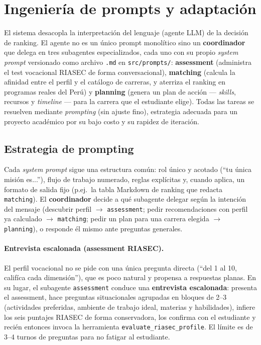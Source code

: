 \section{Ingenier\'ia de prompts y adaptaci\'on}
\label{sec:prompts}

El sistema desacopla la interpretaci\'on del lenguaje (agente LLM) de la
decisi\'on de ranking. El agente no es un \'unico prompt monol\'itico sino un
\textbf{coordinador} que delega en tres subagentes especializados, cada uno con
su propio \emph{system prompt} versionado como archivo \texttt{.md} en
\texttt{src/prompts/}: \textbf{assessment} (administra el test vocacional
RIASEC de forma conversacional), \textbf{matching} (calcula la afinidad entre
el perfil y el cat\'alogo de carreras, y aterriza el ranking en programas
reales del Per\'u) y \textbf{planning} (genera un plan de
acci\'on --- \emph{skills}, recursos y \emph{timeline} --- para la carrera que
el estudiante elige). Todas las tareas se resuelven mediante \emph{prompting}
(sin ajuste fino), estrategia adecuada para un proyecto acad\'emico por su bajo
costo y su rapidez de iteraci\'on.

\subsection{Estrategia de prompting}

Cada \emph{system prompt} sigue una estructura com\'un: rol \'unico y acotado
(``tu \'unica misi\'on es...''), flujo de trabajo numerado, reglas expl\'icitas
y, cuando aplica, un formato de salida fijo (p.ej.\ la tabla Markdown de
ranking que redacta \texttt{matching}). El \textbf{coordinador} decide a qu\'e
subagente delegar seg\'un la intenci\'on del mensaje (descubrir perfil
$\rightarrow$ \texttt{assessment}; pedir recomendaciones con perfil ya
calculado $\rightarrow$ \texttt{matching}; pedir un plan para una carrera
elegida $\rightarrow$ \texttt{planning}), o responde \'el mismo ante preguntas
generales.

\paragraph{Entrevista escalonada (assessment RIASEC).} El perfil vocacional no
se pide con una \'unica pregunta directa (``del 1 al 10, calif\'ica cada
dimensi\'on''), que es poco natural y propensa a respuestas planas. En su
lugar, el subagente \texttt{assessment} conduce una \textbf{entrevista
escalonada}: presenta el assessment, hace preguntas situacionales agrupadas en
bloques de 2--3 (actividades preferidas, ambiente de trabajo ideal, materias y
habilidades), infiere los seis puntajes RIASEC de forma conservadora, los
confirma con el estudiante y reci\'en entonces invoca la herramienta
\texttt{evaluate\_riasec\_profile}. El l\'imite es de 3--4 turnos de preguntas
para no fatigar al estudiante.


